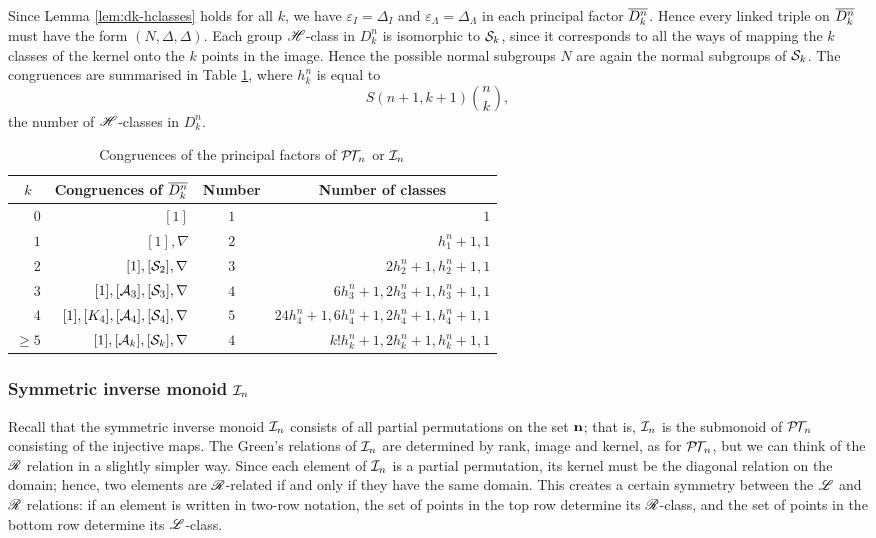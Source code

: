 Since Lemma \ref{lem:dk-hclasses} holds for all $k$, we have
$\varepsilon_I = \Delta_I$ and $\varepsilon_\Lambda = \Delta_\Lambda$ in each
principal factor $\overline{D_k^n}$.  Hence every linked triple on $\overline{D_k^n}$ must
have the form $(N, \Delta, \Delta)$.  Each group $\mathrel{\mathscr{H}}$-class in $D_k^n$ is
isomorphic to $\mathcal{S}_k$, since it corresponds to all the ways of mapping the
$k$ classes of the kernel onto the $k$ points in the image.  Hence the possible
normal subgroups $N$ are again the normal subgroups of $\mathcal{S}_k$.
The congruences are summarised in Table \ref{tab:dkstar-congs-ptn}, where
$h_k^n$ is equal to $$S(n+1, k+1) \binom{n}{k},$$ the number of $\mathrel{\mathscr{H}}$-classes in
$D_k^n$.

\begin{table}[h]
  \centering
  \renewcommand{\arraystretch}{1.3}
  \begin{tabular}{| r | r | c | r |}
    \hline
    \multicolumn{1}{|c|}{$k$} & \multicolumn{1}{c|}{\textbf{Congruences of $\overline{D_k^n}$}} & \textbf{Number} & \multicolumn{1}{c|}{\textbf{Number of classes}} \\
    \hline
    $0$ & $[1]$ & $1$ & $1$ \\
    $1$ & $[1], \nabla$ & $2$ & $h_1^n+1, 1$ \\
    $2$ & $[1], [\mathcal{S}_2], \nabla$ & $3$ & $2h_2^n+1, h_2^n+1, 1$ \\
    $3$ & $[1], [\mathcal{A}_3], [\mathcal{S}_3], \nabla$ & $4$ & $6h_3^n+1, 2h_3^n+1, h_3^n+1, 1$ \\
    $4$ & $[1], [K_4], [\mathcal{A}_4], [\mathcal{S}_4], \nabla$ & $5$ & $24h_4^n+1, 6h_4^n+1, 2h_4^n+1, h_4^n+1, 1$ \\
    $\geq 5$ & $[1], [\mathcal{A}_k], [\mathcal{S}_k], \nabla$ & $4$ & $k!h_k^n+1, 2h_k^n+1, h_k^n+1, 1$ \\
    \hline
  \end{tabular}
  \caption{Congruences of the principal factors of $\mathcal{P\!T\!}_n$ or
    $\mathcal{I}_n$}
  \label{tab:dkstar-congs-ptn}
\end{table}

\subsubsection{Symmetric inverse monoid $\mathcal{I}_n$}
\label{sec:princfact-in}
Recall that the symmetric inverse monoid $\mathcal{I}_n$ consists of all partial
permutations on the set $\mathbf{n}$; that is, $\mathcal{I}_n$ is the submonoid of $\mathcal{P\!T\!}_n$
consisting of the injective maps.  The Green's relations of $\mathcal{I}_n$ are
determined by rank, image and kernel, as for $\mathcal{P\!T\!}_n$, but we can think of the
$\mathrel{\mathscr{R}}$ relation in a slightly simpler way.  Since each element of $\mathcal{I}_n$ is a
partial permutation, its kernel must be the diagonal relation on the domain;
hence, two elements are $\mathrel{\mathscr{R}}$-related if and only if they have the same domain.
This creates a certain symmetry between the $\mathrel{\mathscr{L}}$ and $\mathrel{\mathscr{R}}$ relations: if an
element is written in two-row notation, the set of points in the top row
determine its $\mathrel{\mathscr{R}}$-class, and the set of points in the bottom row determine its
$\mathrel{\mathscr{L}}$-class.

